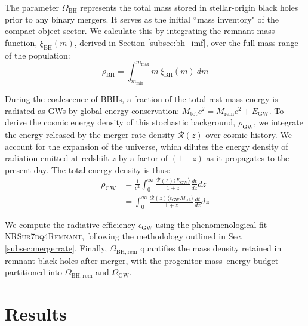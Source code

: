 \documentclass[twocolumn]{aastex631}
\begin{document}
The parameter $\Omega_\mathrm{BH}$ represents the total mass stored in stellar-origin black holes prior to any binary mergers. It serves as the initial ``mass inventory" of the compact object sector. We calculate this by integrating the remnant mass function, $\xi_\mathrm{BH}(m)$, derived in Section \ref{subsec:bh_imf}, over the full mass range of the population:
\begin{equation} 
\rho_\mathrm{BH} = \int_{m_\mathrm{min}}^{m_\mathrm{max}} m~\xi_\mathrm{BH}(m)~dm \end{equation}

During the coalescence of BBHs, a fraction of the total rest-mass energy is radiated as GWs by global energy conservation: $M_\mathrm{tot} c^2 = M_\mathrm{rem} c^2 + E_\mathrm{GW}$. To derive the cosmic energy density of this stochastic background, $\rho_\mathrm{GW}$, we integrate the energy released by the merger rate density $\mathcal{R}(z)$ over cosmic history. We account for the expansion of the universe, which dilutes the energy density of radiation emitted at redshift $z$ by a factor of $(1+z)$ as it propagates to the present day. The total energy density is thus:
\begin{align}
    \rho_\mathrm{GW} &= \frac{1}{c^2} \int^{\infty}_0 \frac{\mathcal{R}(z) \langle E_\mathrm{GW} \rangle}{1+z} \frac{dt}{dz}dz\\
    &= \int^{\infty}_0 \frac{\mathcal{R}(z) \langle \epsilon_\mathrm{GW} M_\mathrm{tot}\rangle}{1+z} \frac{dt}{dz}dz
\end{align}

We compute the radiative efficiency $\epsilon_\mathrm{GW}$ using the phenomenological fit \textsc{NRSur7dq4Remnant}, following the methodology outlined in Sec. \ref{subsec:mergerrate}. Finally, $\Omega_\mathrm{BH,rem}$ quantifies the mass density retained in remnant black holes after merger, with the progenitor mass–energy budget partitioned into $\Omega_\mathrm{BH,rem}$ and $\Omega_\mathrm{GW}$.


\section{Results} 
\end{document}
